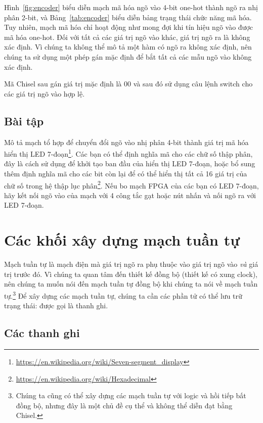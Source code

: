 \documentclass[%
    10pt,
    headinclude, footexclude,
    openright, %
    notitlepage,
    cleardoubleempty,
    headsepline,
    pointlessnumbers,
    bibtotoc, idxtotoc,
    ]{scrbook}
\newcommand{\myref}[2]{\href{#1}{#2}}
\renewcommand{\myref}[2]{{#2}{\footnote{\url{#1}}}}
\begin{document}
Hình~\ref{fig:encoder} biểu diễn mạch mã hóa ngõ vào 4-bit one-hot thành ngõ ra nhị phân 2-bit, 
và Bảng~\ref{tab:encoder} biểu diễn bảng trạng thái chức năng mã hóa. Tuy nhiên, mạch mã hóa chỉ 
hoạt động như mong đợi khi tín hiệu ngõ vào được mã hóa one-hot. Đối với tất cả các giá trị ngõ vào khác, 
giá trị ngõ ra là không xác định. Vì chúng ta không thể mô tả một hàm có ngõ ra không xác định, 
nên chúng ta sử dụng một phép gán mặc định để bắt tất cả các mẫu ngõ vào không xác định.

Mã Chisel sau gán giá trị mặc định là 00 và sau đó sử dụng câu lệnh switch cho các giá trị ngõ vào hợp lệ.


\section{Bài tập}

Mô tả mạch tổ hợp để chuyển đổi ngõ vào nhị phân 4-bit thành giá trị mã hóa 
\myref{https://en.wikipedia.org/wiki/Seven-segment_display}{hiển thị LED 7-đoạn}.
Các bạn có thể định nghĩa mã cho các chữ số thập phân, đây là cách sử dụng để khởi tạo ban đầu của hiển thị 
LED 7-đoạn, hoặc bổ sung thêm định nghĩa mã cho các bit còn lại để có thể hiển thị tất cả 
16 giá trị của chữ số trong \myref{https://en.wikipedia.org/wiki/Hexadecimal}{hệ thập lục phân}.
Nếu bo mạch FPGA của các bạn có LED 7-đoạn, hãy kết nối ngõ vào của mạch với 4 công tắc gạt hoặc nút nhấn 
và nối ngõ ra với LED 7-đoạn.

\chapter{Các khối xây dựng mạch tuần tự}

Mạch tuần tự là mạch điện mà giá trị ngõ ra phụ thuộc vào giá trị ngõ vào \emph{và}
giá trị trước đó. Vì chúng ta quan tâm đến thiết kế đồng bộ (thiết kế có xung clock),
nên chúng ta muốn nói đến mạch tuần tự đồng bộ khi chúng ta nói về mạch tuần 
tự.\footnote{Chúng ta cũng có thể xây dựng các mạch tuần tự với logic và hồi tiếp 
bất đồng bộ, nhưng đây là một chủ đề cụ thể và không thể diễn đạt bằng Chisel.}
Để xây dựng các mạch tuần tự, chúng ta cần các phần tử có thể lưu trữ trạng thái: được gọi là thanh ghi.

\section{Các thanh ghi}
\end{document}
